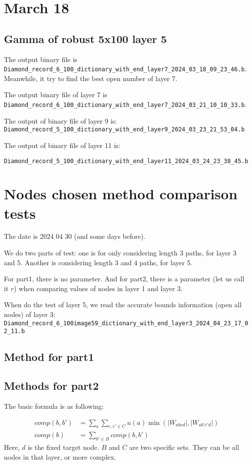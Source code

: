 \documentclass{llncs}
\begin{document}
\section{March 18}

\subsection*{Gamma of robust 5x100 layer 5}

The output binary file is \verb*|Diamond_record_6_100_dictionary_with_end_layer7_2024_03_18_09_23_46.b|. Meanwhile, it try to find the best open number of layer 7.


The output binary file of layer 7 is \verb*|Diamond_record_6_100_dictionary_with_end_layer7_2024_03_21_10_10_33.b|.


The output of binary file of layer 9 is: \verb*|Diamond_record_5_100_dictionary_with_end_layer9_2024_03_23_21_53_04.b|

The output of binary file of layer 11 is:

\verb*|Diamond_record_5_100_dictionary_with_end_layer11_2024_03_24_23_38_45.b|


\section{Nodes chosen method comparison tests}

The date is 2024 04 30 (and some days before).

We do two parts of test: one is for only considering length 3 paths, for layer 3 and 5. Another is considering length 3 and 4 paths, for layer 5.

For part1, there is no parameter. And for part2, there is a parameter (let us call it $r$) when comparing values of nodes in layer 1 and layer 3. 


When do the test of layer 5, we read the accurate bounds information (open all nodes) of layer 3: \verb*|Diamond_record_6_100image59_dictionary_with_end_layer3_2024_04_23_17_02_11.b| 


\subsection*{Method for part1}


\subsection*{Methods for part2}


The basic formula is as following: 

\begin{align*}
	comp(b,b') &= \sum_{a}\sum_{c,c'\in C} u(a)\min(|W_{abcd}|,|W_{ab'c'd}|)\\
	comp(b) &= \sum_{b'\in B} comp(b,b')
\end{align*} Here, $d$ is the fixed target node. $B$ and $C$ are two specific sets. They can be all nodes in that layer, or more complex.
\end{document}
